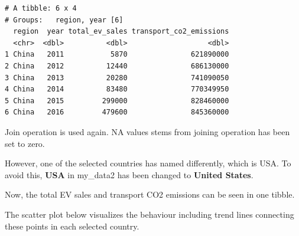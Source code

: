 \documentclass[
  11pt,
  a4paper,
  DIV=11,
  numbers=noendperiod]{scrartcl}
\begin{document}
\begin{verbatim}
# A tibble: 6 x 4
# Groups:   region, year [6]
  region  year total_ev_sales transport_co2_emissions
  <chr>  <dbl>          <dbl>                   <dbl>
1 China   2011           5870               621890000
2 China   2012          12440               686130000
3 China   2013          20280               741090050
4 China   2014          83480               770349950
5 China   2015         299000               828460000
6 China   2016         479600               845360000
\end{verbatim}

Join operation is used again. NA values stems from joining operation has
been set to zero.

However, one of the selected countries has named differently, which is
USA. To avoid this, \textbf{USA} in my\_data2 has been changed to
\textbf{United States}.

Now, the total EV sales and transport CO2 emissions can be seen in one
tibble.

The scatter plot below visualizes the behaviour including trend lines
connecting these points in each selected country.
\end{document}
